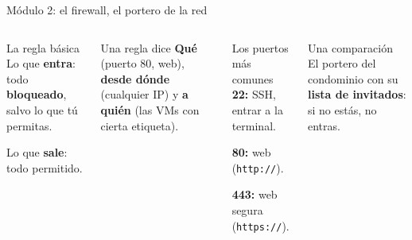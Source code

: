 \documentclass[aspectratio=169,10pt,c]{beamer}
\begin{document}
\begin{frame}{Módulo 2: el firewall, el portero de la red}
\begin{center}
\end{center}
\begin{columns}[T,onlytextwidth]
\begin{block}{La regla básica}
\small Lo que \textbf{entra}: todo \textbf{bloqueado}, salvo lo que tú permitas.\par\smallskip
Lo que \textbf{sale}: todo permitido.
\end{block}
\begin{exampleblock}{Una regla dice}
\small \textbf{Qué} (puerto 80, web), \textbf{desde dónde} (cualquier IP) y \textbf{a quién} (las VMs con cierta etiqueta).
\end{exampleblock}
\begin{block}{Los puertos más comunes}
\small
\textbf{22:} SSH, entrar a la terminal.\par
\textbf{80:} web (\texttt{http://}).\par
\textbf{443:} web segura (\texttt{https://}).
\end{block}
\begin{alertblock}{Una comparación}
\small El portero del condominio con su \textbf{lista de invitados}: si no estás, no entras.
\end{alertblock}
\end{columns}
\end{frame}
\end{document}
